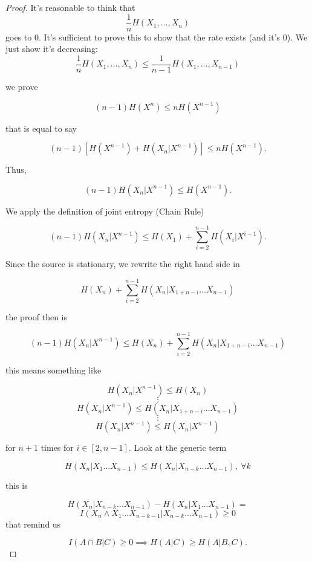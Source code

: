 \begin{proof} It's reasonable to think that $$\dfrac{1}{n}H(X_1, \ldots, X_n)$$ goes to 0. It's sufficient to prove this to show that the rate exists (and it's 0). We just show it's decreasing:
\begin{equation}
 \dfrac{1}{n}H(X_1, \ldots, X_n)  \leq \dfrac{1}{n-1}H(X_1, \ldots, X_{n-1})  
\end{equation}

\ie we prove

\begin{equation}
 (n-1)H(X^n)  \leq nH(X^{n-1})  
\end{equation}

that is equal to say

\begin{equation}
 (n-1)[H(X^{n-1}) + H(X_n | X^{n-1})]  \leq nH(X^{n-1}) . 
\end{equation}

Thus,

\begin{equation}
  (n-1)H(X_n | X^{n-1})  \leq H(X^{n-1}).
\end{equation}

We apply the definition of joint entropy (Chain Rule)

\begin{equation}
 (n-1)H(X_n | X^{n-1})  \leq H(X_1) + \sum_{i=2}^{n-1}H(X_i|X^{i-1}).
\end{equation}

Since the source is stationary, we rewrite the right hand side in

\[
 H(X_n) + \sum_{i=2}^{n-1} H(X_n|X_{1 + n - i} \ldots X_{n-1})
\]

the proof then is

\begin{equation}
(n-1)H(X_n|X^{n-1}) \leq H(X_n) + \sum_{i=2}^{n-1}H(X_n | X_{1+n-i} \ldots X_{n-1}) 
\end{equation}

this means something like

\[
 H(X_n|X^{n-1}) \leq H(X_n)
\]
\[
 \vdots
\]
\[
 H(X_n|X^{n-1}) \leq H(X_n | X_{1+n-i} \ldots X_{n-1}) 
\]
\[
 \vdots
\]
\[
 H(X_n|X^{n-1}) \leq H(X_n|X^{n-1})
\]

for $n+1$ times for $i \in [2, n-1]$. Look at the generic term

\[
 H(X_n|X_1 \ldots X_{n-1}) \leq H(X_n|X_{n-k}\ldots X_{n-1}),\ \forall k
\]

this is

\[
 H(X_n | X_{n-k} \ldots X_{n-1}) -H(X_n|X_1\ldots X_{n-1}) =
\]
\[
 I(X_n \wedge X_1 \ldots X_{n-k-1} | X_{n-k} \ldots X_{n-1}) \geq 0
\]
that remind us

\[
 I(A \cap B | C) \geq 0 \implies H(A|C) \geq H(A | B,C).
\]
\end{proof}

